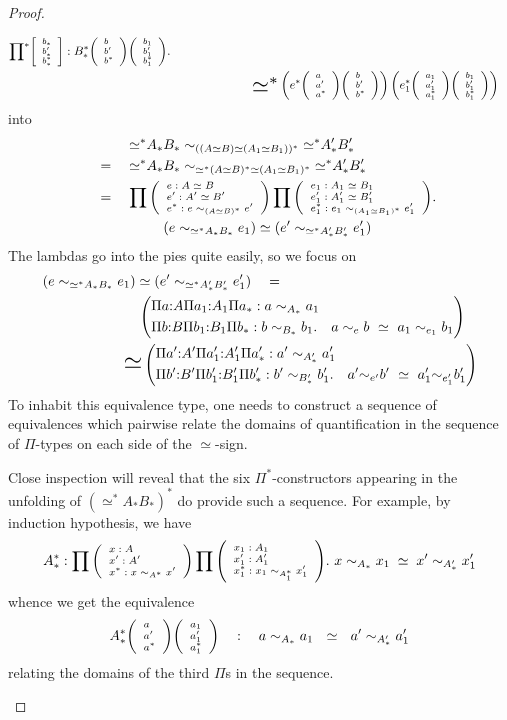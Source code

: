 \documentclass[10pt]{article}
\newcommand{\eq}{\quad=\quad}
\newcommand{\of}{\quad : \quad}
\newcommand{\phan}{\phantom{\eq}\;}
\newcommand{\phanq}{\phantom{\eq\qquad}}
\newcommand{\hista}{\!\raisebox{1mm}{${}^*$}}
\newcommand{\bseq}{\raisebox{-1mm}{\scalebox{1.8}{${\eeq^*}$}}}
\newcommand{\eeq}{\simeq}
\newcommand{\seq}{{\eeq}^*}
\newcommand{\trip}[3]{
{\scriptsize \left[
  \begin{array}{l}
    {#1}\\
    {#2}\\
    {#3}
  \end{array}
\right]}}
\newcommand{\tripar}[3]{
{\scriptsize \left(
  \begin{array}{l}
    {#1}\\
    {#2}\\
    {#3}
  \end{array}
\right)}}
\begin{document}
\begin{proof}
\begin{description}
\begin{align*}
\prod\hista \trip{b_*}{b_*'}{b_*^*} : B_*^* \tripar{b}{b'}{b^*} \tripar{b_1}{b_1'}{b_1^*}.\\
&\phanq\qquad \bseq \left(e^* \tripar{a}{a'}{a^*}
  \tripar{b}{b'}{b^*}\right)
\left(e_1^* \tripar{a_1}{a_1'}{a_1^*} \tripar{b_1}{b_1'}{b_1^*}\right)\\
\end{align*}
into
\renewcommand{\phan}{\hspace{1.17cm}}
\begin{align*}
&\phan \seq A_* B_* \sim_{((A \eeq B) \eeq (A_1 \eeq B_1))^*} \seq A_*' B_*'\\
&\eq \seq A_* B_* \sim_{\seq (A \eeq B)^* \eeq (A_1 \eeq B_1)^*} \seq A_*' B_*'\\
&\eq \prod \tripar {e : A \eeq B}{e':A' \eeq B'}{e^* : e \sim_{(A
  \eeq B)^*} e'} \prod \tripar {e_1 : A_1 \eeq B_1}{e_1':A_1' \eeq B_1'}{e_1^*: e_1 \sim_{(A_1
  \eeq B_1)^*} e_1'}.\\
&\phanq\quad (e \sim_{\seq A_* B_*} e_1) \eeq (e' \sim_{\seq A_*' B_*'} e_1')
\end{align*}
\newcommand{\beq}{\scalebox{1.7}{${\eeq}$}}
The lambdas go into the pies quite easily, so we focus on
\begin{align}
&(e \sim_{\seq A_* B_*} e_1) \eeq (e' \sim_{\seq A_*' B_*'} e_1')
\eq \label{yeaaay}\\
&\phanq \qquad \left(\begin{aligned}
&\Pi a{:}A \Pi a_1{:}A_1 \Pi a_* : a \sim_{A_*} a_1\\
&\Pi b{:}B \Pi b_1{:}B_1 \Pi b_* : b \sim_{B_*} b_1. \quad
 a \sim_e b \ \eeq\ a_1 \sim_{e_1} b_1
\end{aligned}\right) \notag\\
&\phanq \quad\beq \left(\begin{aligned}
&\Pi a'{:}A' \Pi a'_1{:}A'_1 \Pi a'_* : a' \sim_{A'_*} a'_1\\
&\Pi b'{:}B' \Pi b'_1{:}B'_1 \Pi b'_* : b' \sim_{B'_*} b'_1. \quad
 a' {\sim_{e'}} b' \ \eeq\ a'_1 {\sim_{e'_1}} b'_1
\end{aligned}\right) \notag
\end{align}
To inhabit this equivalence type, one needs to construct a sequence
of equivalences which pairwise relate the domains of quantification
in the sequence of $\Pi$-types on each side of the $\eeq$-sign.

Close inspection will reveal that the six $\Pi^*$-constructors
appearing in the unfolding of
$(\seq A_* B_*)^*$ do provide such a sequence.
For example, by induction hypothesis, we have
\[A_*^* : \prod \tripar{x : A}{x': A'}{x^*: x \sim_{A^*} x'}
\prod \tripar{x_1:A_1}{x_1':A'_1}{x_1^* : x_1 \sim_{A_1^*} x_1'}.\ 
x \sim_{A_*} x_1 \; \eeq \; x' \sim_{A'_*} x'_1\]
whence we get the equivalence
\[ A_*^* \tripar{a}{a'}{a^*} \tripar{a_1}{a_1'}{a_1^*}  \of
a \sim_{A_*} a_1 \ \ \eeq\ \  a' \sim_{A'_*} a'_1\]
relating the domains of the third $\Pi$s in the sequence.


\end{description}
\end{proof}
\end{document}
